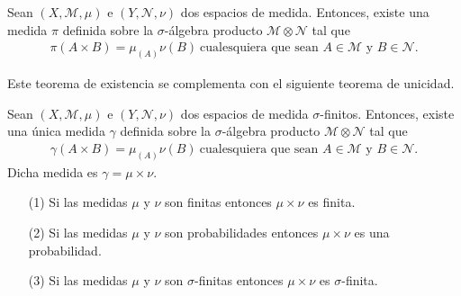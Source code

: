 \begin{teo}
    Sean $(X, \mathcal{M}, \mu)$ e $(Y, \mathcal{N}, \nu)$ dos espacios de medida. Entonces, existe una medida $\pi$ definida sobre la $\sigma$-álgebra producto $\mathcal{M} \otimes \mathcal{N}$ tal que
    \begin{align*}
        \pi(A \times B) = \mu_(A)\nu(B) \ \text{cualesquiera que sean } A \in \mathcal{M} \text{ y } B \in \mathcal{N}.
    \end{align*}
\end{teo}
Este teorema de existencia se complementa con el siguiente teorema de unicidad.
\begin{teo}
    Sean $(X, \mathcal{M}, \mu)$ e $(Y, \mathcal{N}, \nu)$ dos espacios de medida $\sigma$-finitos. Entonces, existe una única medida $\gamma$ definida sobre la $\sigma$-álgebra producto $\mathcal{M} \otimes \mathcal{N}$ tal que
    \begin{align*}
        \gamma(A \times B) = \mu_(A)\nu(B) \ \text{cualesquiera que sean } A \in \mathcal{M} \text{ y } B \in \mathcal{N}.
    \end{align*}
    Dicha medida es $\gamma = \mu \times \nu$.
\end{teo}

\begin{obs}
    \begin{enumerate}
        \item[(1)] Si las medidas $\mu$ y $\nu$ son finitas entonces $\mu \times \nu$ es finita.
        \item[(2)] Si las medidas $\mu$ y $\nu$ son probabilidades entonces $\mu \times \nu$ es una probabilidad.
        \item[(3)] Si las medidas $\mu$ y $\nu$ son $\sigma$-finitas entonces $\mu \times \nu$ es $\sigma$-finita.
    \end{enumerate}
\end{obs}

